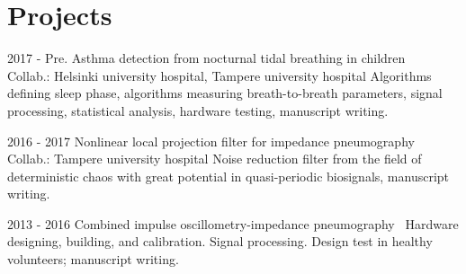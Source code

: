 \documentclass[letterpaper]{twentysecondcv} %
\begin{document}
\makeprofile %



\section{Projects}
\begin{twenty} %
	\twentyitem
    	{2017 - Pre.}
        {Asthma detection from nocturnal tidal breathing in children~\cite{children,infants}}
        {\\Collab.: Helsinki university hospital, Tampere university hospital }
        {\normalsize Algorithms defining sleep phase, algorithms measuring breath-to-breath parameters, signal processing, statistical analysis, hardware testing, manuscript writing.}
        {}

	\twentyitem
    	{2016 - 2017}
        {Nonlinear local projection filter for impedance pneumography~\cite{nlpf}}
        {\\Collab.: Tampere university hospital }
        {\normalsize Noise reduction filter from the field of deterministic chaos with great potential in quasi-periodic biosignals, manuscript writing.}
        {}  
  
  \twentyitem
    	{2013 - 2016}
        {Combined impulse oscillometry-impedance pneumography~\cite{iosj,multi}}
        {}
        {\normalsize Hardware designing, building, and calibration. Signal processing. Design test in healthy volunteers;  manuscript writing.}
        {     }     
        
\end{twenty} 


\end{document}
